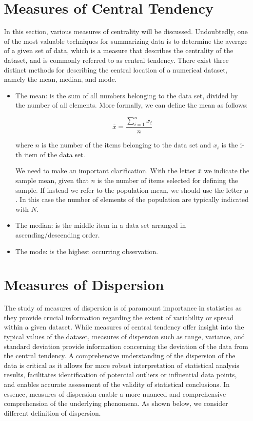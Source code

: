 \documentclass[
  letterpaper,
  DIV=11,
  numbers=noendperiod]{scrreprt}
\begin{document}
\hypertarget{measures-of-central-tendency}{%
\section{Measures of Central
Tendency}\label{measures-of-central-tendency}}

In this section, various measures of centrality will be discussed.
Undoubtedly, one of the most valuable techniques for summarizing data is
to determine the average of a given set of data, which is a measure that
describes the centrality of the dataset, and is commonly referred to as
central tendency. There exist three distinct methods for describing the
central location of a numerical dataset, namely the mean, median, and
mode.

\begin{itemize}
\item
  The mean: is the sum of all numbers belonging to the data set, divided
  by the number of all elements. More formally, we can define the mean
  as follows:

  \[
  \bar{x} = \frac{\sum_{i=1}^n x_i}{n}
  \]

  where \(n\) is the number of the items belonging to the data set and
  \(x_{i}\) is the i-th item of the data set.

  We need to make an important clarification. With the letter
  \(\bar{x}\) we indicate the sample mean, given that \(n\) is the
  number of items selected for defining the sample. If instead we refer
  to the population mean, we should use the letter \(\mu\). In this case
  the number of elements of the population are typically indicated with
  \(N\).
\item
  The median: is the middle item in a data set arranged in
  ascending/descending order.
\item
  The mode: is the highest occurring observation.
\end{itemize}

\hypertarget{measures-of-dispersion}{%
\section{Measures of Dispersion}\label{measures-of-dispersion}}

The study of measures of dispersion is of paramount importance in
statistics as they provide crucial information regarding the extent of
variability or spread within a given dataset. While measures of central
tendency offer insight into the typical values of the dataset, measures
of dispersion such as range, variance, and standard deviation provide
information concerning the deviation of the data from the central
tendency. A comprehensive understanding of the dispersion of the data is
critical as it allows for more robust interpretation of statistical
analysis results, facilitates identification of potential outliers or
influential data points, and enables accurate assessment of the validity
of statistical conclusions. In essence, measures of dispersion enable a
more nuanced and comprehensive comprehension of the underlying
phenomena. As shown below, we consider different definition of
dispersion.
\end{document}
